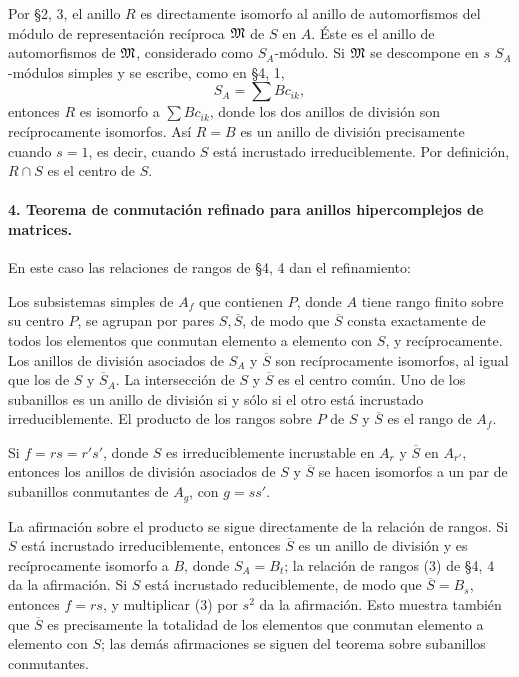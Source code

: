 Por §2, 3, el anillo \(R\) es directamente isomorfo al anillo de automorfismos del módulo de representación recíproca \(\mathfrak M\) de \(S\) en \(A\). Éste es el anillo de automorfismos de \(\mathfrak M\), considerado como \(S_A\)-módulo. Si \(\mathfrak M\) se descompone en \(s\) \(S_A\)-módulos simples y se escribe, como en §4, 1,
\[
        S_A=\sum Bc_{ik},
\]
entonces \(R\) es isomorfo a \(\sum Bc_{ik}\), donde los dos anillos de división son recíprocamente isomorfos. Así \(R=B\) es un anillo de división precisamente cuando \(s=1\), es decir, cuando \(S\) está incrustado irreduciblemente. Por definición, \(R\cap S\) es el centro de \(S\).

\paragraph{4. Teorema de conmutación refinado para anillos hipercomplejos de matrices.}
En este caso las relaciones de rangos de §4, 4 dan el refinamiento:

Los subsistemas simples de \(A_f\) que contienen \(P\), donde \(A\) tiene rango finito sobre su centro \(P\), se agrupan por pares \(S,\overline S\), de modo que \(\overline S\) consta exactamente de todos los elementos que conmutan elemento a elemento con \(S\), y recíprocamente. Los anillos de división asociados de \(S_A\) y \(\overline S\) son recíprocamente isomorfos, al igual que los de \(S\) y \(\overline S_A\). La intersección de \(S\) y \(\overline S\) es el centro común. Uno de los subanillos es un anillo de división si y sólo si el otro está incrustado irreduciblemente. El producto de los rangos sobre \(P\) de \(S\) y \(\overline S\) es el rango de \(A_f\).

Si \(f=rs=r's'\), donde \(S\) es irreduciblemente incrustable en \(A_r\) y \(\overline S\) en \(A_{r'}\), entonces los anillos de división asociados de \(S\) y \(\overline S\) se hacen isomorfos a un par de subanillos conmutantes de \(A_g\), con \(g=ss'\).

La afirmación sobre el producto se sigue directamente de la relación de rangos. Si \(S\) está incrustado irreduciblemente, entonces \(\overline S\) es un anillo de división y es recíprocamente isomorfo a \(B\), donde \(S_A=B_t\); la relación de rangos (3) de §4, 4 da la afirmación. Si \(S\) está incrustado reduciblemente, de modo que \(\overline S=B_s\), entonces \(f=rs\), y multiplicar (3) por \(s^2\) da la afirmación. Esto muestra también que \(\overline S\) es precisamente la totalidad de los elementos que conmutan elemento a elemento con \(S\); las demás afirmaciones se siguen del teorema sobre subanillos conmutantes.

